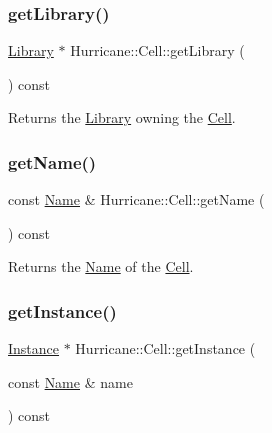 \subsubsection{\texorpdfstring{get\+Library()}{getLibrary()}}
{\footnotesize\ttfamily \mbox{\hyperlink{classHurricane_1_1Library}{Library}} $\ast$ Hurricane\+::\+Cell\+::get\+Library (\begin{DoxyParamCaption}{ }\end{DoxyParamCaption}) const\hspace{0.3cm}{\ttfamily [inline]}}

Returns the \mbox{\hyperlink{classHurricane_1_1Library}{Library}} owning the \mbox{\hyperlink{classHurricane_1_1Cell}{Cell}}. \mbox{\label{classHurricane_1_1Cell_a01cd4bba972d484496fd297648b8fa0c}} 
\subsubsection{\texorpdfstring{get\+Name()}{getName()}}
{\footnotesize\ttfamily const \mbox{\hyperlink{classHurricane_1_1Name}{Name}} \& Hurricane\+::\+Cell\+::get\+Name (\begin{DoxyParamCaption}{ }\end{DoxyParamCaption}) const\hspace{0.3cm}{\ttfamily [inline]}}

Returns the \mbox{\hyperlink{classHurricane_1_1Name}{Name}} of the \mbox{\hyperlink{classHurricane_1_1Cell}{Cell}}. \mbox{\label{classHurricane_1_1Cell_abaf178b24734de37cf0ac31918c096ac}} 
\subsubsection{\texorpdfstring{get\+Instance()}{getInstance()}}
{\footnotesize\ttfamily \mbox{\hyperlink{classHurricane_1_1Instance}{Instance}} $\ast$ Hurricane\+::\+Cell\+::get\+Instance (\begin{DoxyParamCaption}\item[{const \mbox{\hyperlink{classHurricane_1_1Name}{Name}} \&}]{name }\end{DoxyParamCaption}) const\hspace{0.3cm}{\ttfamily [inline]}}

